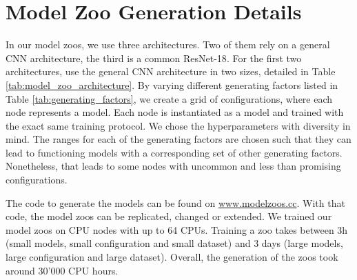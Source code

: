 %
\newpage
\section{Model Zoo Generation Details}
\label{app:zoo_generation}
In our model zoos, we use three architectures. Two of them rely on a general CNN architecture, the third is a common ResNet-18\citep{heDeepResidualLearning2016}. 
For the first two architectures, use the general CNN architecture in two sizes, detailed in Table \ref{tab:model_zoo_architecture}. 
By varying different generating factors listed in Table \ref{tab:generating_factors}, we create a grid of configurations, where each node represents a model. 
Each node is instantiated as a model and trained with the exact same training protocol. 
We chose the hyperparameters with diversity in mind.
The ranges for each of the generating factors are chosen such that they can lead to functioning models with a corresponding set of other generating factors.
Nonetheless, that leads to some nodes with uncommon and less than promising configurations.

The code to generate the models can be found on \href{www.modelzoos.cc}{www.modelzoos.cc}. With that code, the model zoos can be replicated, changed or extended. 
We trained our model zoos on CPU nodes with up to 64 CPUs. Training a zoo takes between 3h (small models, small configuration and small dataset) and 3 days (large models, large configuration and large dataset). 
Overall, the generation of the zoos took around 30'000 CPU hours.


